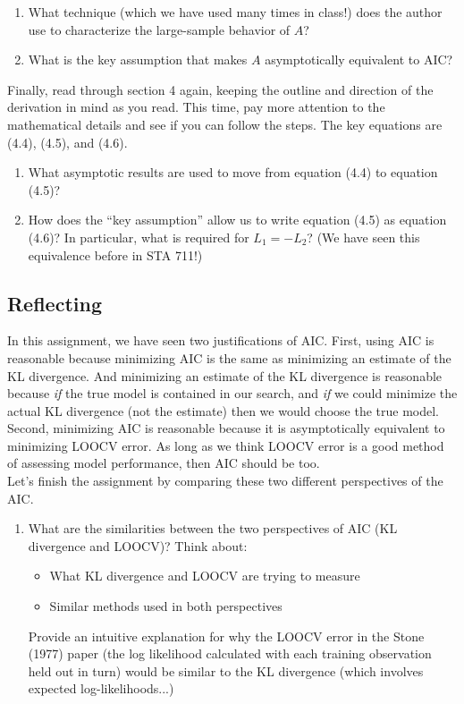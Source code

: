 \documentclass[11pt]{article}
\begin{document}
\begin{enumerate}
\item What technique (which we have used many times in class!) does the author use to characterize the large-sample behavior of $A$?

\item What is the key assumption that makes $A$ asymptotically equivalent to AIC?
\end{enumerate}

\noindent Finally, read through section 4 again, keeping the outline and direction of the derivation in mind as you read. This time, pay more attention to the mathematical details and see if you can follow the steps. The key equations are (4.4), (4.5), and (4.6).

\begin{enumerate}
\item What asymptotic results are used to move from equation (4.4) to equation (4.5)?

\item How does the ``key assumption'' allow us to write equation (4.5) as equation (4.6)? In particular, what is required for $L_1 = -L_2$? (We have seen this equivalence before in STA 711!)
\end{enumerate}

\subsection*{Reflecting}

In this assignment, we have seen two justifications of AIC. First, using AIC is reasonable because minimizing AIC is the same as minimizing an estimate of the KL divergence. And minimizing an estimate of the KL divergence is reasonable because \textit{if} the true model is contained in our search, and \textit{if} we could minimize the actual KL divergence (not the estimate) then we would choose the true model. Second, minimizing AIC is reasonable because it is asymptotically equivalent to minimizing LOOCV error. As long as we think LOOCV error is a good method of assessing model performance, then AIC should be too.\\

\noindent Let's finish the assignment by comparing these two different perspectives of the AIC.

\begin{enumerate}
\item  What are the similarities between the two perspectives of AIC (KL divergence and LOOCV)? Think about:

\begin{itemize}
\item What KL divergence and LOOCV are trying to measure
\item Similar methods used in both perspectives
\end{itemize}

Provide an intuitive explanation for why the LOOCV error in the Stone (1977) paper (the log likelihood calculated with each training observation held out in turn) would be similar to the KL divergence (which involves expected log-likelihoods...)
\end{enumerate}
\end{document}
